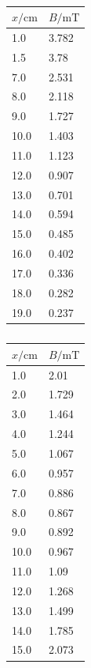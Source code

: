 \documentclass[11pt,ngerman,a4paper]{article}
\begin{document}
\begin{table}
\centering
\begin{tabular}{ll}
\toprule
{$x / \si{\centi\meter}$} &{ $B/\si{\milli\tesla}$ }\\
\midrule
1.0 & 3.782\\
1.5 & 3.78\\
7.0 & 2.531\\
8.0 & 2.118\\
9.0 & 1.727\\
10.0 & 1.403\\
11.0 & 1.123\\
12.0 & 0.907\\
13.0 & 0.701\\
14.0 & 0.594\\
15.0 & 0.485\\
16.0 & 0.402\\
17.0 & 0.336\\
18.0 & 0.282\\
19.0 & 0.237\\
\bottomrule
\end{tabular}
\label{}
\caption{}
\end{table}

\begin{table}
\centering
\begin{tabular}{ll}
\toprule
{$x / \si{\centi\meter}$} &{ $B/\si{\milli\tesla}$ }\\
\midrule
1.0 & 2.01\\
2.0 & 1.729\\
3.0 & 1.464\\
4.0 & 1.244\\
5.0 & 1.067\\
6.0 & 0.957\\
7.0 & 0.886\\
8.0 & 0.867\\
9.0 & 0.892\\
10.0 & 0.967\\
11.0 & 1.09\\
12.0 & 1.268\\
13.0 & 1.499\\
14.0 & 1.785\\
15.0 & 2.073\\
\bottomrule
\end{tabular}
\label{}
\caption{}
\end{table}
\end{document}
